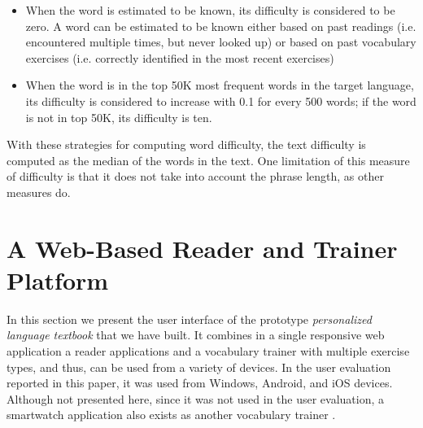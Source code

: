 \begin{itemize}
	\item When the word is estimated to be known, its difficulty is considered to be zero. A word can be estimated to be known either based on past readings (i.e. encountered multiple times, but never looked up) or based on past vocabulary exercises (i.e. correctly identified in the most recent exercises) 
	\item When the word is in the top 50K most frequent words in the target language, its difficulty is considered to increase with 0.1 for every 500 words; if the word is not in top 50K, its difficulty is ten.
\end{itemize}

With these strategies for computing word difficulty, the text difficulty is computed as the median of the words in the text. One limitation of this measure of difficulty is that it does not take into account the phrase length, as other measures do. \cite{Kincaid75-Readability}


\newpage
\section{A Web-Based Reader and Trainer Platform}


	
	In this section we present the user interface of the prototype {\em personalized language textbook} that we have built. It combines in a single responsive web application a reader applications and a vocabulary trainer with multiple exercise types, and thus, can be used from a variety of devices. In the user evaluation reported in this paper, it was used from Windows, Android, and iOS devices. Although not presented here, since it was not used in the user evaluation, a smartwatch application also exists as another vocabulary trainer \cite{Nien16-time}.

